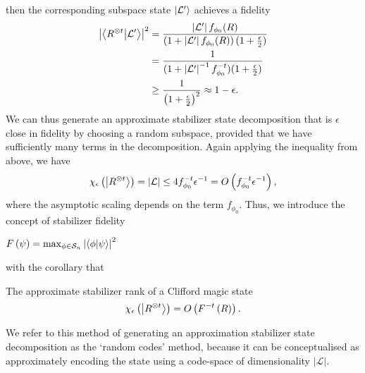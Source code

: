 then the corresponding subspace state $\ket{\mathcal{L'}}$ achieves a fidelity
\begin{align}
\left|\braket{R^{\otimes t}}{\mathcal{L'}}\right|^{2}&=\frac{\left|\mathcal{L'}\right|f_{\phi_{0}}(R)}{\left(1+\left|\mathcal{L'}\right|f_{\phi_{0}}(R)\right)(1+\frac{\epsilon}{2})}\nonumber \\
&= \frac{1}{(1+\left|\mathcal{L'}\right|^{-1}f_{\phi_{0}}^{-t})(1+\frac{\epsilon}{2})} \nonumber \\
&\geq \frac{1}{\left(1+\frac{\epsilon}{2}\right)^{2}} \approx 1 - \epsilon.
\label{eq:clifford_fidelity}
\end{align}
We can thus generate an approximate stabilizer state decomposition that is $\epsilon$ close in fidelity by choosing a random subspace, provided that we have sufficiently many terms in the decomposition. Again applying the inequality from above, we have
\begin{equation}
\chi_{\epsilon}\left(\ket{R^{\otimes t}}\right) = \left|\mathcal{L}\right| \leq 4 f_{\phi_{0}}^{-t}\epsilon^{-1}=O\left(f_{\phi_{0}}^{-t}\epsilon^{-1}\right),
\label{eq:clifford_approx_rank}
\end{equation}
where the asymptotic scaling depends on the term $f_{\phi_{0}}$. Thus, we introduce the concept of stabilizer fidelity
\begin{defn}
$F\left(\psi\right) = \max_{\phi \in\mathcal{S}_{n}} \left|\braket{\phi}{\psi}\right|^{2}$
\label{def:stabilizer_fidelity}
\end{defn}
with the corollary that
\begin{cor}
The approximate stabilizer rank of a Clifford magic state 
\[\chi_{\epsilon}\left(\ket{R^{\otimes t}}\right) = O\left(F^{-t}\left(R\right)\right).\]
\end{cor}
We refer to this method of generating an approximation stabilizer state decomposition as the `random codes' method, because it can be conceptualised as approximately encoding the state using a code-space of dimensionality $\left|\mathcal{L}\right|$.
